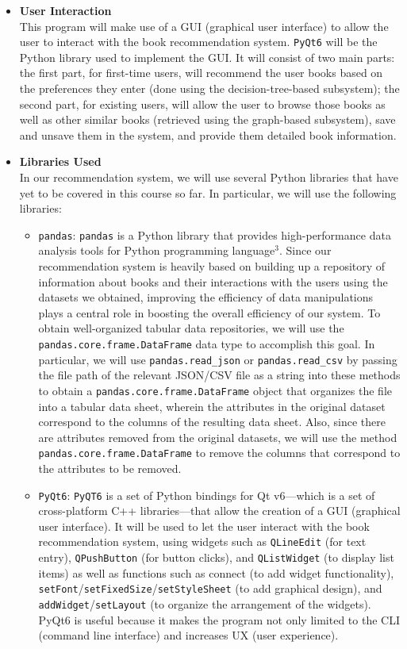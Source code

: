 \documentclass[fontsize=11pt]{article}
\begin{document}
\begin{itemize}
\item \textbf{User Interaction} \\
This program will make use of a GUI (graphical user interface) to allow the user to interact with the book recommendation system. \texttt{PyQt6} will be the Python library used to implement the GUI. It will consist of two main parts: the first part, for first-time users, will recommend the user books based on the preferences they enter (done using the decision-tree-based subsystem); the second part, for existing users, will allow the user to browse those books as well as other similar books (retrieved using the graph-based subsystem), save and unsave them in the system, and provide them detailed book information.

\item \textbf{Libraries Used} \\
In our recommendation system, we will use several Python libraries that have yet to be covered in this course so far. In particular, we will use the following libraries:
\begin{itemize}
\item \texttt{pandas}: \texttt{pandas} is a Python library that provides high-performance data analysis tools for Python programming language$^3$. Since our recommendation system is heavily based on building up a repository of information about books and their interactions with the users using the datasets we obtained, improving the efficiency of data manipulations plays a central role in boosting the overall efficiency of our system. To obtain well-organized tabular data repositories, we will use the \texttt{pandas.core.frame.DataFrame} data type to accomplish this goal. In particular, we will use \texttt{pandas.read\_json} or \texttt{pandas.read\_csv} by passing the file path of the relevant JSON/CSV file as a string into these methods to obtain a \texttt{pandas.core.frame.DataFrame} object that organizes the file into a tabular data sheet, wherein the attributes in the original dataset correspond to the columns of the resulting data sheet. Also, since there are attributes removed from the original datasets, we will use the method \texttt{pandas.core.frame.DataFrame} to remove the columns that correspond to the attributes to be removed.
\item \texttt{PyQt6}: \texttt{PyQT6} is a set of Python bindings for Qt v6—which is a set of cross-platform C++ libraries—that allow the creation of a GUI (graphical user interface). It will be used to let the user interact with the book recommendation system, using widgets such as \texttt{QLineEdit} (for text entry), \texttt{QPushButton} (for button clicks), and \texttt{QListWidget} (to display list items) as well as functions such as connect (to add widget functionality), \texttt{setFont}/\texttt{setFixedSize}/\texttt{setStyleSheet} (to add graphical design), and \texttt{addWidget}/\texttt{setLayout} (to organize the arrangement of the widgets). PyQt6 is useful because it makes the program not only limited to the CLI (command line interface) and increases UX (user experience).

\end{itemize}
\end{itemize}
\end{document}
